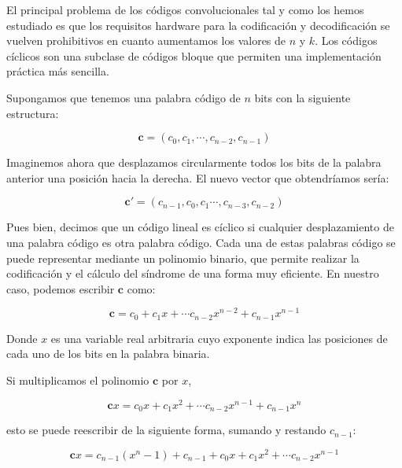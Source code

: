 \documentclass[es,apuntes]{uah}
\begin{document}
{El principal problema de los códigos convolucionales tal y como los hemos estudiado es que los requisitos hardware para la codificación y decodificación se vuelven prohibitivos en cuanto aumentamos los valores de $n$ y $k$. Los códigos cíclicos son una subclase de códigos bloque que permiten una implementación práctica más sencilla. 

Supongamos que tenemos una palabra código de $n$ bits con la siguiente estructura:

\begin{displaymath}
	\mathbf{c} = (c_0, c_1, \cdots , c_{n-2}, c_{n-1})
\end{displaymath}

Imaginemos ahora que desplazamos circularmente todos los bits de la palabra anterior una posición hacia la derecha. El nuevo vector que obtendríamos sería:

\begin{displaymath}
	\mathbf{c'} = (c_{n-1}, c_0, c_1 \cdots , c_{n-3}, c_{n-2})
\end{displaymath}

Pues bien, decimos que un código lineal es cíclico si cualquier desplazamiento de una palabra código es otra palabra código. Cada una de estas palabras código se puede representar mediante un polinomio binario, que permite realizar la codificación y el cálculo del síndrome de una forma muy eficiente. En nuestro caso, podemos escribir $\mathbf{c}$ como:

\begin{displaymath}
	\mathbf{c} = c_0 + c_1 x + \cdots c_{n-2} x^{n-2} + c_{n-1} x^{n-1}
\end{displaymath}

Donde $x$ es una variable real arbitraria cuyo exponente indica las posiciones de cada uno de los bits en la palabra binaria. 

Si multiplicamos el polinomio $\mathbf{c}$ por $x$,

\begin{displaymath}
	\mathbf{c} x = c_0 x + c_1 x^2 + \cdots c_{n-2} x^{n-1} + c_{n-1} x^{n}
\end{displaymath}

esto se puede reescribir de la siguiente forma, sumando y restando $c_{n-1}$:

\begin{displaymath}
	\mathbf{c} x = c_{n-1} (x^n - 1) + c_{n-1} + c_0 x + c_1 x^2 + \cdots c_{n-2} x^{n-1} 
\end{displaymath}

}
\end{document}
